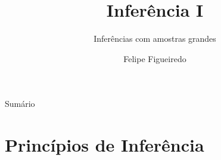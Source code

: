 \documentclass{beamer}
\title%
{Inferência I}
\subtitle
{Inferências com amostras grandes} %
\author%
{Felipe Figueiredo}%
\institute[INTO] %
{Instituto Nacional de Traumatologia e Ortopedia
}
\date%
{}
\begin{document}
\begin{frame}
  \titlepage
\end{frame}

\begin{frame}{Sumário}
  \tableofcontents
\end{frame}







\section{Princípios de Inferência}
\end{document}
